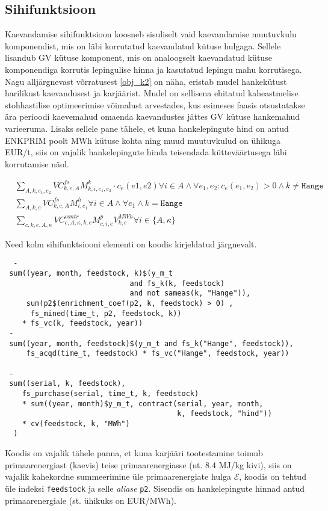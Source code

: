 \documentclass[10pt,a4paper]{article}
\begin{document}
\subsection{Sihifunktsioon}
Kaevandamise sihifunktsioon koosneb sisuliselt vaid kaevandamise muutuvkulu komponendist, mis on läbi korrutatud kaevandatud kütuse hulgaga. Sellele lisandub GV kütuse komponent, mis on analoogselt kaevandatud kütuse komponendiga korrutis lepingulise hinna ja kasutatud lepingu mahu korrutisega. Nagu alljärgnevast võrratusest \ref{obj_k2} on näha, eristab mudel hankekütust harilikust kaevandusest ja karjäärist. Mudel on sellisena ehitatud kaheastmelise stohhastilise optimeerimise võimalust arvestades, kus esimeses faasis otsustatakse ära perioodi kaevemahud omaenda kaevandustes jättes GV kütuse hankemahud varieeruma. Lisaks sellele pane tähele, et kuna hankelepingute hind on antud ENKPRIM poolt MWh kütuse kohta ning muud muutuvkulud on ühikuga EUR/t, siis on vajalik hankelepingute hinda teisendada kütteväärtusega läbi korrutamise näol.

\begin{align}
&\sum_{A,k,e_1,e_2} VC^{fs}_{k, e, A} M^k_{k,i,e_1, e_2} \cdot c_e(e1, e2)  \forall i \in A \land \forall e_1, e_2 : c_e(e_1, e_2)>0 \land k \neq \texttt{Hange } \label{obj_k1} \\
&\sum_{A,k,e} VC^{fs}_{k, e, A} M^h_{i,e_1}  \forall i \in A \land \forall e_1 \land k = \texttt{Hange } \label{obj_k2}\\
&\sum_{c, k, e, A, \kappa} VC^{contr}_{c, A, \kappa, k, e} M^p_{c,i,e} V^{MWh}_{k,e}  \forall i \in \{A, \kappa\} \label{obj_k3}
\end{align}

Need kolm sihifunktsiooni elementi on koodis kirjeldatud järgnevalt.
\begin{verbatim}
  -
 sum((year, month, feedstock, k)$(y_m_t
                             and fs_k(k, feedstock)
                             and not sameas(k, "Hange")),
     sum(p2$(enrichment_coef(p2, k, feedstock) > 0) ,
      fs_mined(time_t, p2, feedstock, k))
    * fs_vc(k, feedstock, year))
 -
 sum((year, month, feedstock)$(y_m_t and fs_k("Hange", feedstock)),
     fs_acqd(time_t, feedstock) * fs_vc("Hange", feedstock, year))

 -
 sum((serial, k, feedstock),
    fs_purchase(serial, time_t, k, feedstock)
    * sum((year, month)$y_m_t, contract(serial, year, month, 
                                        k, feedstock, "hind"))
    * cv(feedstock, k, "MWh")
  )
\end{verbatim}
Koodis on vajalik tähele panna, et kuna karjääri tootestamine toimub primaarenergiast (kaevis) teise primaarenergiasse (nt. 8.4 MJ/kg kivi), siis on vajalik kahekordne summeerimine üle primaarenergiate hulga $\mathcal{E}$, koodis on tehtud üle indeksi \texttt{feedstock} ja selle \emph{aliase} \texttt{p2}. Sisendis on hankelepingute hinnad antud primaarenergiale (st. ühikuks on EUR/MWh).
\end{document}
